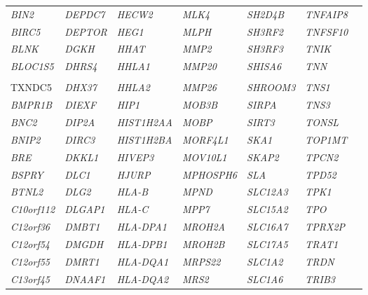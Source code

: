 \begin{refsection}
\begin{otherlanguage}{english}
\begin{scriptsize}
\begin{longtable}{lllllll}
\textit{BIN2} & \textit{DEPDC7} & \textit{HECW2} & \textit{MLK4} & \textit{SH2D4B} & \textit{TNFAIP8} & \textit{} \\
\textit{BIRC5} & \textit{DEPTOR} & \textit{HEG1} & \textit{MLPH} & \textit{SH3RF2} & \textit{TNFSF10} & \textit{} \\
\textit{BLNK} & \textit{DGKH} & \textit{HHAT} & \textit{MMP2} & \textit{SH3RF3} & \textit{TNIK} & \textit{} \\
\textit{BLOC1S5} & \textit{DHRS4} & \textit{HHLA1} & \textit{MMP20} & \textit{SHISA6} & \textit{TNN} & \textit{} \\
\textit{\begin{tabular}[c]{@{}l@{}}BLOC1S5-\\ TXNDC5\end{tabular}} & \textit{DHX37} & \textit{HHLA2} & \textit{MMP26} & \textit{SHROOM3} & \textit{TNS1} & \textit{} \\
\textit{BMPR1B} & \textit{DIEXF} & \textit{HIP1} & \textit{MOB3B} & \textit{SIRPA} & \textit{TNS3} & \textit{} \\
\textit{BNC2} & \textit{DIP2A} & \textit{HIST1H2AA} & \textit{MOBP} & \textit{SIRT3} & \textit{TONSL} & \textit{} \\
\textit{BNIP2} & \textit{DIRC3} & \textit{HIST1H2BA} & \textit{MORF4L1} & \textit{SKA1} & \textit{TOP1MT} & \textit{} \\
\textit{BRE} & \textit{DKKL1} & \textit{HIVEP3} & \textit{MOV10L1} & \textit{SKAP2} & \textit{TPCN2} & \textit{} \\
\textit{BSPRY} & \textit{DLC1} & \textit{HJURP} & \textit{MPHOSPH6} & \textit{SLA} & \textit{TPD52} & \textit{} \\
\textit{BTNL2} & \textit{DLG2} & \textit{HLA-B} & \textit{MPND} & \textit{SLC12A3} & \textit{TPK1} & \textit{} \\
\textit{C10orf112} & \textit{DLGAP1} & \textit{HLA-C} & \textit{MPP7} & \textit{SLC15A2} & \textit{TPO} & \textit{} \\
\textit{C12orf36} & \textit{DMBT1} & \textit{HLA-DPA1} & \textit{MROH2A} & \textit{SLC16A7} & \textit{TPRX2P} & \textit{} \\
\textit{C12orf54} & \textit{DMGDH} & \textit{HLA-DPB1} & \textit{MROH2B} & \textit{SLC17A5} & \textit{TRAT1} & \textit{} \\
\textit{C12orf55} & \textit{DMRT1} & \textit{HLA-DQA1} & \textit{MRPS22} & \textit{SLC1A2} & \textit{TRDN} & \textit{} \\
\textit{C13orf45} & \textit{DNAAF1} & \textit{HLA-DQA2} & \textit{MRS2} & \textit{SLC1A6} & \textit{TRIB3} & \textit{} \\

\end{longtable}
\end{scriptsize}
\end{otherlanguage}
\end{refsection}
